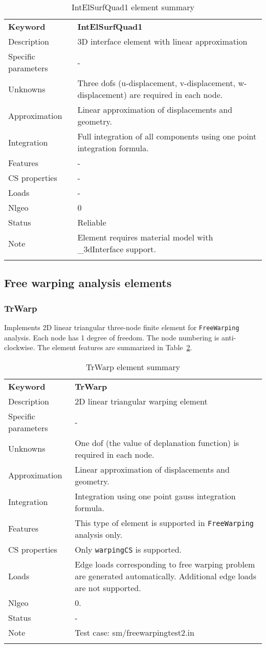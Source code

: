 \documentclass[a4paper]{article}
\newcommand{\param}[1]{\texttt{#1}} %
\newcommand{\templabel}{}%
\newcommand{\tempcaption}{}%
\newcounter{nelpar}
\newenvironment{elementsummary}[5]{%
  \gdef\tempcaption{#4}%
  \gdef\templabel{#5}%
  \setcounter{nelpar}{0}%
  \begin{center} %
    \begin{table}[!htb] %
      \begin{tabular}{|l|p{9cm}|}\hline %
        {\bf Keyword} & \bf{#1}\\ %
        {Description} & {#2}\\ %
        {Specific parameters} & {#3}\\ \hline %
}{
  \\ \hline %
      \end{tabular}%
      \caption{\tempcaption}%
      \label{\templabel}%
    \end{table}%
  \end{center}%
}
\newcommand{\elementParam}[1]{%
  \ifthenelse{\value{nelpar}>0} %
             {&{#1}}%
             {\setcounter{nelpar}{1}Parameters&{#1}}%
             \\%
}
\newcommand{\elementDescription}[2]{{#1} & {#2}\\ }
\begin{document}
\begin{elementsummary}{IntElSurfQuad1}{3D  interface element with linear approximation}{-}{IntElSurfQuad1 element summary}{Interface3dquadlinsummary}
\elementDescription{Unknowns}{Three dofs (u-displacement, v-displacement, w-displacement) are required in each node.}
\elementDescription{Approximation}{Linear approximation of displacements and geometry.}
\elementDescription{Integration}{Full integration of all components using one point integration formula.}
\elementDescription{Features}{-}
\elementDescription{CS properties}{-}
\elementDescription{Loads}{-}
\elementDescription{Nlgeo}{0}
\elementDescription{Status}{Reliable}
\elementDescription{Note}{Element requires material model with \_3dInterface support.}
\end{elementsummary}


\clearpage
\subsection{Free warping analysis elements}
\subsubsection{TrWarp}
Implements 2D linear triangular three-node finite element for \param{FreeWarping} analysis. Each node has 1 degree of freedom.
The node numbering is anti-clockwise. The element features are summarized in Table~\ref{TrWarpsummary}.


\begin{elementsummary}{TrWarp}{2D linear triangular warping element}{-}{TrWarp element summary}{TrWarpsummary}
\elementDescription{Unknowns}{One dof (the value of deplanation function) is required in each node.}
\elementDescription{Approximation}{Linear approximation of displacements and geometry.}
\elementDescription{Integration}{Integration using one point gauss integration formula.}
\elementDescription{Features}{This type of element is supported in \param{FreeWarping} analysis only.}
\elementDescription{CS properties}{Only \param{warpingCS} is supported.}
\elementDescription{Loads}{Edge loads corresponding to free warping problem are generated automatically. Additional edge loads are not supported.}
\elementDescription{Nlgeo}{0.}
\elementDescription{Status}{-}
\elementDescription{Note}{Test case: sm/freewarpingtest2.in}
\end{elementsummary}
\end{document}
